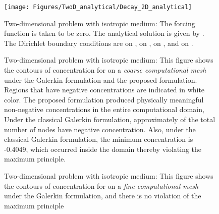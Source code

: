 \documentclass[11pt]{amsart}
\begin{document}
\begin{figure}[h]
  \centering
  \texttt{[image: Figures/TwoD\_analytical/Decay\_2D\_analytical]}
  \caption{Two-dimensional problem with isotropic medium: The forcing function is taken to be 
    zero. The analytical solution is given by . The Dirichlet boundary 
    conditions are  
    on ,  on , 
     on , and  on .} 
  \label{Fig:Helmholtz_2D_analytical}
\end{figure}

\begin{figure}[h]
  \centering
\caption{Two-dimensional problem with isotropic medium: This figure shows the 
    contours of concentration for  on a \emph{coarse computational mesh} 
    under the Galerkin formulation and the proposed formulation. Regions that have 
    negative concentrations are indicated in white color. The proposed formulation 
    produced physically meaningful non-negative concentrations in the entire computational 
    domain, Under the classical Galerkin formulation, approximately  of the total 
    number of nodes have negative concentration. Also, under the classical Galerkin 
    formulation, the  minimum concentration is -0.4049, which occurred inside the 
    domain thereby violating the maximum principle.}\label{Fig:Decay_2D_coarse_mesh}
\end{figure}

\begin{figure}[h]
  \centering
\caption{Two-dimensional problem with isotropic medium: This figure shows the 
    contours of concentration for  on a \emph{fine computational mesh} 
    under the Galerkin formulation, and there is no violation of the maximum principle}
  \label{Fig:Decay_2D_fine_mesh}
\end{figure}
\end{document}

